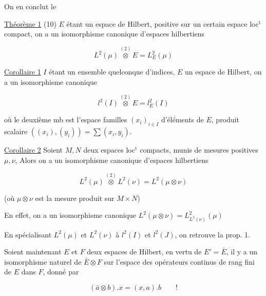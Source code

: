 On en conclut le

\uline{Théorème 1} (10) $E$ étant un espace de Hilbert,   positive sur un certain espace loc$^{\mathrm{t}}$ compact,
on a un isomorphisme canonique d'espaces hilbertiens

\[
L^2(\mu)\overset{(2)}{\otimes}E=L^2_E(\mu) \tag*{(11)}
\]

\uline{Corollaire 1} $I$ étant un ensemble quelconque d'indices, $E$
un  espace de Hilbert, on a un isomorphisme
canonique

\[
l^2(I)\overset{(2)}{\otimes}E=l^2_E(I) \tag*{(12)}
\]

où le deuxième mb est l'espace  
 familles  $(x_i)_{i\in I}$ d'éléments de $E$,  
  produit scalaire $((x_i),(y_i))=\sum(x_i,y_i)$.

\uline{Corollaire 2} Soient $M,N$ deux espaces loc$^{\mathrm{t}}$ compacts,
munis de mesures positives $\mu,\nu$, Alors  on
a un isomorphisme canonique d'espaces hilbertiens

\[
L^2(\mu)\overset{(2)}{\otimes}L^2(\nu)=L^2(\mu\otimes\nu) \tag*{(13)}
\]

(où $\mu\otimes\nu$ est la mesure produit  sur $M\times N$)

En effet, on a un isomorphisme canonique $L^2(\mu\otimes\nu)=L^2_{L^2(\nu)}(\mu)$

En spécialisant $L^2(\mu)$ et $L^2(\nu)$ à $l^2(I)$ et $l^2(J)$, on
 retrouve la prop. 1.

Soient maintenant $E$ et $F$ deux espaces de Hilbert,
en vertu de $E'=\bar E$,  il y a un
isomorphisme naturel de $\bar E\otimes F$ sur l'espace des
opérateurs  continus de rang fini de
$E$ dans $F$, donné par

\[
(\bar a\otimes b).x=(x,a).b\qquad! \tag*{(14)}
\]

